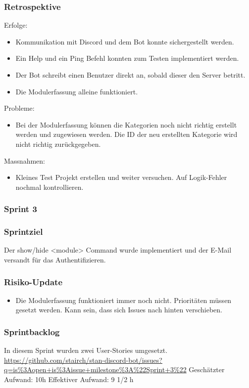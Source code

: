 \documentclass[a4paper, table]{article}
\begin{document}
\subsubsection*{Retrospektive}
Erfolge:
\begin{itemize}
    \item Kommunikation mit Discord und dem Bot konnte sichergestellt werden.
    \item Ein Help und ein Ping Befehl konnten zum Testen implementiert werden.
    \item Der Bot schreibt einen Benutzer direkt an, sobald dieser den Server betritt.
    \item Die Modulerfassung alleine funktioniert.
\end{itemize}
Probleme:
\begin{itemize}
    \item Bei der Modulerfassung können die Kategorien noch nicht richtig erstellt werden und zugewiesen werden.
    Die ID der neu erstellten Kategorie wird nicht richtig zurückgegeben.
\end{itemize}
Massnahmen:
\begin{itemize}
    \item Kleines Test Projekt erstellen und weiter versuchen. Auf Logik-Fehler nochmal kontrollieren.
\end{itemize}
\newpage

\subsubsection{Sprint 3}
\subsubsection*{Sprintziel}
Der show/hide <module> Command wurde implementiert und der E-Mail versandt für das Authentifizieren.

\subsubsection*{Risiko-Update}
\begin{itemize}
    \item Die Modulerfassung funktioniert immer noch nicht.
    Prioritäten müssen gesetzt werden.
    Kann sein, dass sich Issues nach hinten verschieben.
\end{itemize}

\subsubsection*{Sprintbacklog}
In diesem Sprint wurden zwei User-Stories umgesetzt.\\
\url{https://github.com/stairch/stan-discord-bot/issues?q=is%3Aopen+is%3Aissue+milestone%3A%22Sprint+3%22}
\newline
Geschätzter Aufwand: 10h
\newline
Effektiver Aufwand: 9 1/2 h
\end{document}
